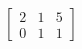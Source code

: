 \documentclass[preview]{standalone}
\begin{document}
\begin{align*}
\left[\begin{array}{cc|c} 2 & 1 & 5 \\ 0 & 1 & 1 \end{array}\right]
\end{align*}
\end{document}
